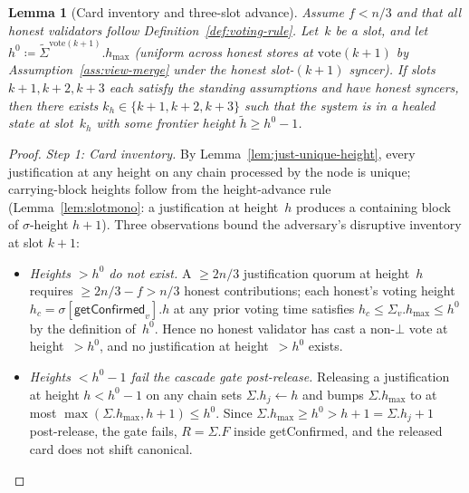 \documentclass{article}
\newcommand{\hmax}{\ensuremath{h_{\max}}\xspace}
\newcommand{\vote}{\ensuremath{\mathrm{vote}}}
\newcommand{\comm}[1]{\ensuremath{\widetilde{#1}}}
\newcommand{\getConfirmed}{\textsf{getConfirmed}\xspace}
\theoremstyle{plain}
\newtheorem{lemma}{Lemma}
\theoremstyle{definition}
\theoremstyle{remark}
\begin{document}
\begin{lemma}[Card inventory and three-slot advance]\label{lem:healing-3slot}
Assume $f < n/3$ and that all honest validators follow Definition~\ref{def:voting-rule}.
Let~$k$ be a slot, and let $h^0 \coloneqq \comm{\Sigma}^{\vote(k+1)}.\hmax$ (uniform across honest stores at $\vote(k+1)$ by Assumption~\ref{ass:view-merge} under the honest slot-$(k+1)$ syncer).
If slots~$k+1, k+2, k+3$ each satisfy the standing assumptions and have honest syncers, then there exists $k_h \in \{k+1, k+2, k+3\}$ such that the system is in a healed state at slot~$k_h$ with some frontier height $\comm{h} \geq h^0 - 1$.
\end{lemma}

\begin{proof}
\emph{Step 1: Card inventory.}
By Lemma~\ref{lem:just-unique-height}, every justification at any height on any chain processed by the node is unique; carrying-block heights follow from the height-advance rule (Lemma~\ref{lem:slotmono}: a justification at height~$h$ produces a containing block of $\sigma$-height $h+1$).
Three observations bound the adversary's disruptive inventory at slot $k+1$:

\begin{itemize}
  \item\emph{Heights $> h^0$ do not exist.}
  A $\geq 2n/3$ justification quorum at height~$h$ requires $\geq 2n/3 - f > n/3$ honest contributions; each honest's voting height $h_c = \sigma[\getConfirmed_v].h$ at any prior voting time satisfies $h_c \leq \Sigma_v.\hmax \leq h^0$ by the definition of~$h^0$.
  Hence no honest validator has cast a non-$\bot$ vote at height~$> h^0$, and no justification at height~$> h^0$ exists.

  \item\emph{Heights $< h^0 - 1$ fail the cascade gate post-release.}
  Releasing a justification at height $h < h^0 - 1$ on any chain sets $\Sigma.h_j \gets h$ and bumps $\Sigma.\hmax$ to at most $\max(\Sigma.\hmax, h + 1) \leq h^0$.
  Since $\Sigma.\hmax \geq h^0 > h + 1 = \Sigma.h_j + 1$ post-release, the gate fails, $R = \Sigma.F$ inside \getConfirmed{}, and the released card does not shift canonical.


\end{itemize}
\end{proof}
\end{document}

